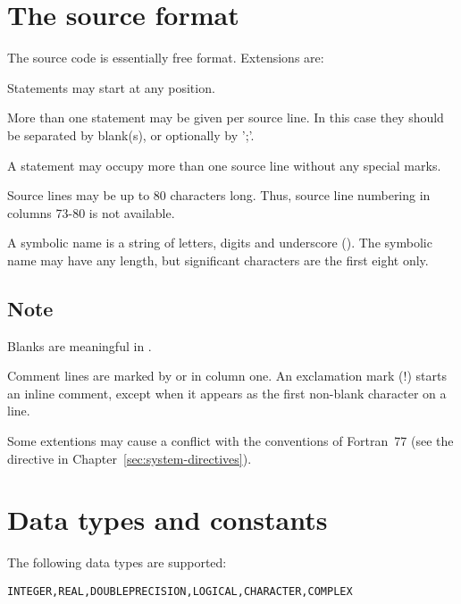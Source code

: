\section{The source format}
 
The \COMIS{} source code is essentially free format. Extensions are:

\begin{UL}
  \item Statements may start at any position.
  \item More than one statement may be given per source line.
        In this case they should be separated by blank(s),
        or optionally by ';'.
  \item A statement may occupy more than one source line without any
        special marks.
  \item Source lines may be up to 80 characters long. Thus,
        source line numbering in columns 73-80 is not available.
  \item A symbolic name is a string of letters, digits and underscore (\Lit{_}).
        The symbolic name may have any length, but significant characters
        are the first eight only.
\end{UL}

\subsection*{Note}

\begin{UL}
\item Blanks are  meaningful in \COMIS{}.
\item Comment lines are marked by  or  in column one.
      An exclamation mark (!) starts an inline comment, except when it appears as
      the first non-blank character on a line.
\item Some extentions may cause a conflict with the conventions of Fortran~77
      (see the  directive in Chapter~\ref{sec:system-directives}).
\end{UL}

\section{Data types and constants}
 
The following data types are supported:
\begin{alltt}
 INTEGER, REAL, DOUBLE PRECISION, LOGICAL, CHARACTER, COMPLEX
\end{alltt}
 
